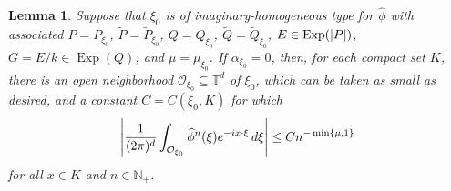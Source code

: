 \documentclass[11pt]{article}
\newtheorem{lemma}[theorem]{Lemma}
\newcommand\Exp{\operatorname{Exp}}
\newcommand{\f}[2]{\frac{#1}{#2}}
\begin{document}
\begin{lemma}\label{lem:EstImagHom}
Suppose that $\xi_0$ is of imaginary-homogeneous type for $\widehat{\phi}$ with associated $P=P_{\xi_0}$, $\widetilde{P}=\widetilde{P}_{\xi_0}$,  $Q=Q_{\xi_0}$, $\widetilde{Q}=\widetilde{Q}_{\xi_0}$, $E\in\Exp(\abs{P})$, $G=E/k\in\Exp(Q)$, and $\mu=\mu_{\xi_0}$. If $\alpha_{\xi_0}=0$, then, for each compact set $K$, there is an open neighborhood $\mathcal{O}_{\xi_0}\subseteq\mathbb{T}^d$ of $\xi_0$, which can be taken as small as desired, and a constant $C=C(\xi_0,K)$ for which
\begin{equation*}
    \abs{\f{1}{(2\pi)^d}\int_{\mathcal{O}_{\xi_0}}\widehat{\phi}^n(\xi)e^{-ix\cdot\xi}\,d\xi}\leq Cn^{-\min\{\mu,1\}}
\end{equation*}
for all $x\in K$ and $n\in\mathbb{N}_+$.
\end{lemma}
\end{document}
